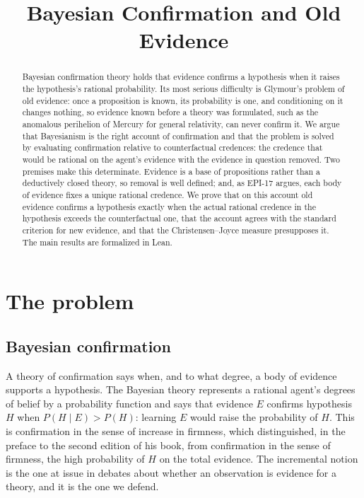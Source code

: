 \documentclass{situationist-preprint}
\title{Bayesian Confirmation and Old Evidence}
\begin{document}
\maketitle

\begin{abstract}
Bayesian confirmation theory holds that evidence confirms a hypothesis when it raises the hypothesis's rational probability. Its most serious difficulty is Glymour's problem of old evidence: once a proposition is known, its probability is one, and conditioning on it changes nothing, so evidence known before a theory was formulated, such as the anomalous perihelion of Mercury for general relativity, can never confirm it. We argue that Bayesianism is the right account of confirmation and that the problem is solved by evaluating confirmation relative to counterfactual credences: the credence that would be rational on the agent's evidence with the evidence in question removed. Two premises make this determinate. Evidence is a base of propositions rather than a deductively closed theory, so removal is well defined; and, as EPI-17 argues, each body of evidence fixes a unique rational credence. We prove that on this account old evidence confirms a hypothesis exactly when the actual rational credence in the hypothesis exceeds the counterfactual one, that the account agrees with the standard criterion for new evidence, and that the Christensen--Joyce measure presupposes it. The main results are formalized in Lean.
\end{abstract}

\section{The problem}\label{s:problem}

\subsection{Bayesian confirmation}

A theory of confirmation says when, and to what degree, a body of evidence supports a hypothesis. The Bayesian theory represents a rational agent's degrees of belief by a probability function and says that evidence $E$ confirms hypothesis $H$ when $P(H \mid E) > P(H)$: learning $E$ would raise the probability of $H$. This is confirmation in the sense of increase in firmness, which \citet{Carnap1950} distinguished, in the preface to the second edition of his book, from confirmation in the sense of firmness, the high probability of $H$ on the total evidence. The incremental notion is the one at issue in debates about whether an observation is evidence for a theory, and it is the one we defend.
\end{document}
